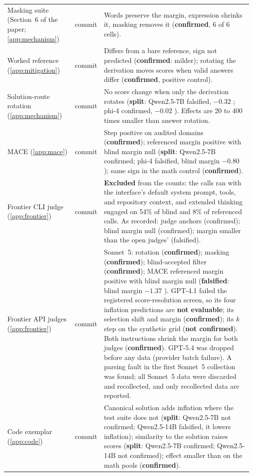 {\begin{longtable}{L{3.2cm}L{1.1cm}L{8.7cm}}
Masking suite (Section~6 of the paper; \cref{app:mechanism}) & commit & Words preserve the margin, expression shrinks it, masking removes it (\textbf{confirmed}, 6 of 6 cells). \\
Worked reference (\cref{app:mitigation}) & commit & Differs from a bare reference, sign not predicted (\textbf{confirmed}: milder); rotating the derivation moves scores when valid answers differ (\textbf{confirmed}, positive control). \\
Solution-route rotation (\cref{app:mechanism}) & commit & No score change when only the derivation rotates (\textbf{split}: Qwen2.5-7B falsified, $-0.32$ ; phi-4 confirmed, $-0.02$ ). Effects are 20 to 400 times smaller than answer rotation. \\
\textsc{MACE} (\cref{app:mace}) & commit & Step positive on audited domains (\textbf{confirmed}); referenced margin positive with blind margin null (\textbf{split}: Qwen2.5-7B confirmed; phi-4 falsified, blind margin $-0.80$ ); same sign in the math control (\textbf{confirmed}). \\
Frontier CLI judge (\cref{app:frontier}) & commit & \textbf{Excluded} from the counts: the calls ran with the interface's default system prompt, tools, and repository context, and extended thinking engaged on 54\% of blind and 8\% of referenced calls. As recorded: judge anchors (confirmed); blind margin null (confirmed); margin smaller than the open judges' (falsified). \\
Frontier API judges (\cref{app:frontier}) & commit & Sonnet~5: rotation (\textbf{confirmed}); masking (\textbf{confirmed}); blind-accepted filter (\textbf{confirmed}); \textsc{MACE} referenced margin positive with blind margin null (\textbf{falsified}: blind margin $-1.37$ ). GPT-4.1 failed the registered score-resolution screen, so its four inflation predictions are \textbf{not evaluable}; its selection shift and margin (\textbf{confirmed}); its $k$ step on the synthetic grid (\textbf{not confirmed}). Both instructions shrink the margin for both judges (\textbf{confirmed}). GPT-5.4 was dropped before any data (provider batch failure). A parsing fault in the first Sonnet~5 collection was found; all Sonnet~5 data were discarded and recollected, and only recollected data are reported. \\
Code exemplar (\cref{app:code}) & commit & Canonical solution adds inflation where the test suite does not (\textbf{split}: Qwen2.5-7B not confirmed; Qwen2.5-14B falsified, it lowers inflation); similarity to the solution raises scores (\textbf{split}: Qwen2.5-7B confirmed; Qwen2.5-14B not confirmed); effect smaller than on the math pools (\textbf{confirmed}). \\

\end{longtable}}

